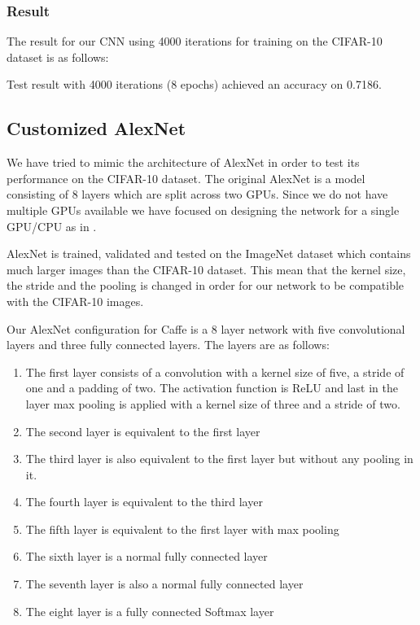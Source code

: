 \subsubsection{Result}

The result for our CNN using 4000 iterations for training on the CIFAR-10
dataset is as follows: 

Test result with 4000 iterations (8 epochs) achieved an accuracy on	0.7186.


\subsection{Customized AlexNet} %
\label{sub:alexNet}

We have tried to mimic the architecture of AlexNet\cite{AlexNet} in order
to test its performance on the CIFAR-10 dataset. The original AlexNet is a model
consisting of 8 layers which are split across two GPUs. Since we
do not have multiple GPUs available we have focused on designing the network for
a single GPU/CPU as in \cite{ZeilerFergus}. 

AlexNet is trained, validated and tested on the ImageNet dataset which contains
much larger images than the CIFAR-10 dataset. This mean that the kernel size,
the stride and the pooling is changed in order for our network to be compatible
with the CIFAR-10 images.


Our AlexNet configuration for Caffe is a 8 layer network with five convolutional
layers and three fully connected layers. The layers are as follows:
\begin{enumerate}
	\item The first layer consists of a convolution with a kernel size of five, a
	stride of one and a padding of two. The activation function is ReLU and last in
	the layer max pooling is applied with a kernel size of three and a stride of
	two. 
	\item The second layer is equivalent to the first layer 
	\item The third layer is also equivalent to the first layer but without any
	pooling in it. 
	\item The fourth layer is equivalent to the third layer 
	\item The fifth layer is equivalent to the first layer with max pooling  
	\item The sixth layer is a normal fully connected layer
	\item The seventh layer is also a normal fully connected layer
	\item The eight layer is a fully connected Softmax layer
\end{enumerate}

